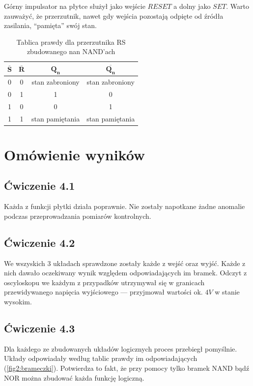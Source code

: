 \documentclass{article}
\begin{document}
      Górny impulsator na płytce służył jako wejście $RESET$ a dolny jako $SET$.
      Warto zauważyć, że przerzutnik, nawet gdy wejścia pozostają odpięte od źródła zasilania, ``pamięta'' swój stan.
      \begin{table}[h]
        \centering
        \begin{tabular}{|c|c|c|c|}
        \hline
        \footnotesize $\mathbf{\overline{S}}$ & \footnotesize $\mathbf{\overline{R}}$ & \footnotesize $\mathbf{Q_n}$ & \footnotesize $\mathbf{\overline{Q_n}}$ \\
        \hline
        0 & 0 & stan zabroniony & stan zabroniony \\
        \hline
        0 & 1 & 1 & 0 \\
        \hline
        1 & 0 & 0 & 1 \\
        \hline
        1 & 1 & stan pamiętania & stan pamiętania \\
        \hline
        \end{tabular}
        \caption{Tablica prawdy dla przerzutnika RS zbudowanego nan NAND'ach}
      \end{table}

    

  \section{Omówienie wyników}
    \subsection{Ćwiczenie 4.1}
      Każda z funkcji płytki działa poprawnie. Nie zostały napotkane żadne anomalie podczas przeprowadzania pomiarów kontrolnych.
    \subsection{Ćwiczenie 4.2}
      We wszyskich 3 układach sprawdzone zostały każde z wejść oraz wyjść. Każde z nich dawało oczekiwany wynik względem odpowiadających im bramek. Odczyt z oscyloskopu we każdym z przypadków utrzymywał się w granicach przewidywanego napięcia wyjściowego --- przyjmował wartości ok. $4V$ w stanie wysokim.
    \subsection{Ćwiczenie 4.3}
      Dla każdego ze zbudowanych układów logicznych proces przebiegł pomyślnie. Układy odpowiadały według tablic prawdy im odpowiadających (\ref{fig2:brameczki}). Potwierdza to fakt, że przy pomocy tylko bramek NAND bądź NOR można zbudować każda funkcję logiczną.
\end{document}
